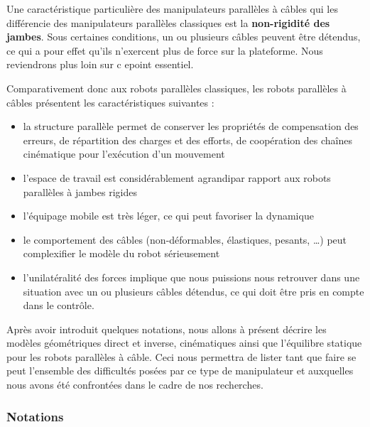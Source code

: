 Une caractéristique particulière des manipulateurs parallèles à câbles qui les différencie des manipulateurs parallèles classiques est la {\bf non-rigidité des jam\-bes}. Sous certaines conditions, un ou plusieurs câbles peuvent être détendus, ce qui a pour effet qu'ils n'exercent plus de force sur la plateforme. Nous reviendrons plus loin sur c epoint essentiel.

Comparativement donc aux robots parallèles classiques, les robots parallèles à câbles présentent les caractéristiques suivantes :
\begin{itemize}
 \item la structure parallèle permet de conserver les propriétés de compensation des erreurs, de répartition des charges et des efforts, de coopération des chaînes cinématique pour l'exécution d'un mouvement
 \item l'espace de travail est considérablement agrandipar rapport aux robots parallèles à jambes rigides
 \item l'équipage mobile est très léger, ce qui peut favoriser la dynamique
 \item le comportement des câbles (non-déformables, élastiques, pesants, \dots) peut complexifier le modèle du robot sérieusement
 \item l'unilatéralité des forces implique que nous puissions nous retrouver dans une situation avec un ou plusieurs câbles détendus, ce qui doit être pris en compte dans le contrôle.
\end{itemize}

Après avoir introduit quelques notations, nous allons à présent décrire les modèles géométriques direct et inverse, cinématiques ainsi que l'équilibre statique pour les robots parallèles à câble. Ceci nous permettra de lister tant que faire se peut l'ensemble des difficultés posées par ce type de manipulateur et auxquelles nous avons été confrontées dans le cadre de nos recherches.

\subsubsection{Notations}

